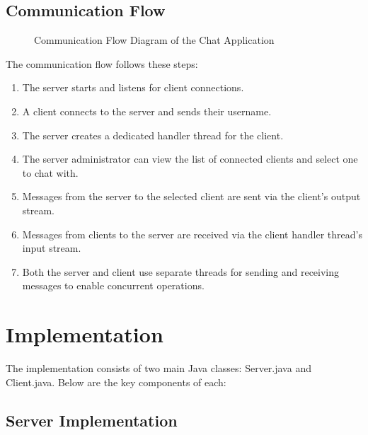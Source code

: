 \documentclass[12pt,a4paper]{article}
\begin{document}
\subsection{Communication Flow}
\begin{figure}[H]
    \centering
    \caption{Communication Flow Diagram of the Chat Application}
    \label{fig:flowchart}
\end{figure}

The communication flow follows these steps:
\begin{enumerate}
    \item The server starts and listens for client connections.
    \item A client connects to the server and sends their username.
    \item The server creates a dedicated handler thread for the client.
    \item The server administrator can view the list of connected clients and select one to chat with.
    \item Messages from the server to the selected client are sent via the client's output stream.
    \item Messages from clients to the server are received via the client handler thread's input stream.
    \item Both the server and client use separate threads for sending and receiving messages to enable concurrent operations.
\end{enumerate}

\section{Implementation}
The implementation consists of two main Java classes: Server.java and Client.java. Below are the key components of each:

\subsection{Server Implementation}
\end{document}
